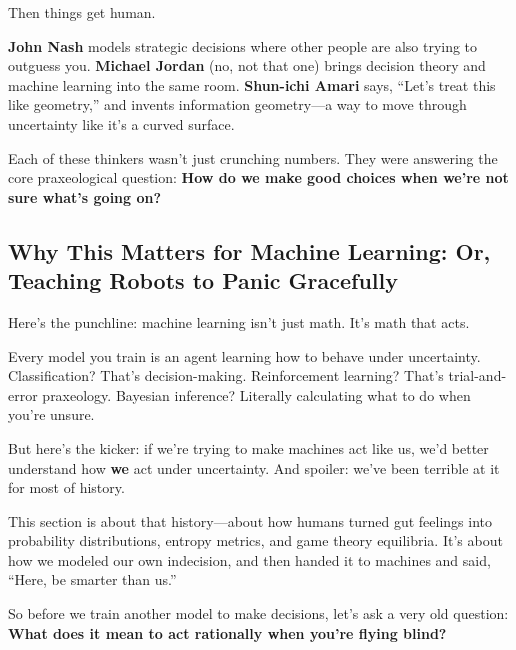 Then things get human.

\textbf{John Nash} models strategic decisions where other people are also trying to outguess you.  
\textbf{Michael Jordan} (no, not that one) brings decision theory and machine learning into the same room.  
\textbf{Shun-ichi Amari} says, “Let’s treat this like geometry,” and invents information geometry—a way to move through uncertainty like it’s a curved surface.

Each of these thinkers wasn’t just crunching numbers. They were answering the core praxeological question:  
\textbf{How do we make good choices when we’re not sure what’s going on?}

\subsection{Why This Matters for Machine Learning: Or, Teaching Robots to Panic Gracefully}

Here’s the punchline: machine learning isn’t just math. It’s math that acts.

Every model you train is an agent learning how to behave under uncertainty. Classification? That’s decision-making. Reinforcement learning? That's trial-and-error praxeology. Bayesian inference? Literally calculating what to do when you’re unsure.

But here's the kicker: if we’re trying to make machines act like us, we’d better understand how \textbf{we} act under uncertainty. And spoiler: we’ve been terrible at it for most of history.

This section is about that history—about how humans turned gut feelings into probability distributions, entropy metrics, and game theory equilibria. It’s about how we modeled our own indecision, and then handed it to machines and said, “Here, be smarter than us.”

So before we train another model to make decisions, let’s ask a very old question:  
\textbf{What does it mean to act rationally when you’re flying blind?}
